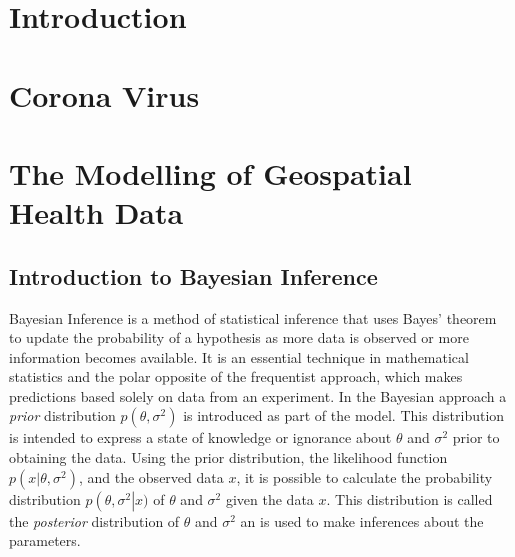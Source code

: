 \documentclass[12pt]{book}
\begin{document}
\tableofcontents
\chapter{Introduction}
\chapter{Corona Virus}
\chapter{The Modelling of Geospatial Health Data}
\section{Introduction to Bayesian Inference}
Bayesian Inference is a method of statistical inference that uses Bayes' theorem to update the probability of a hypothesis as more data is observed or more information becomes available. It is an essential technique in mathematical statistics and the polar opposite of the frequentist approach, which makes predictions based solely on data from an experiment. In the Bayesian approach a \textit{prior} distribution $p\left(\theta, \sigma^2\right)$ is introduced as part of the model. This distribution is intended to express a state of knowledge or ignorance about $\theta$ and $\sigma^2$ prior to obtaining the data. Using the prior distribution, the likelihood function $p\left(x|\theta,\sigma^2\right)$, and the observed data $x$, it is possible to calculate the probability distribution $p\left(\theta,\sigma^2\right|x)$ of $\theta$ and $\sigma^2$ given the data $x$. This distribution is called the \textit{posterior} distribution of $\theta$ and $\sigma^2$ an is used to make inferences about the parameters. \autocite[Cf.][]{box2011bayesian}
\end{document}
